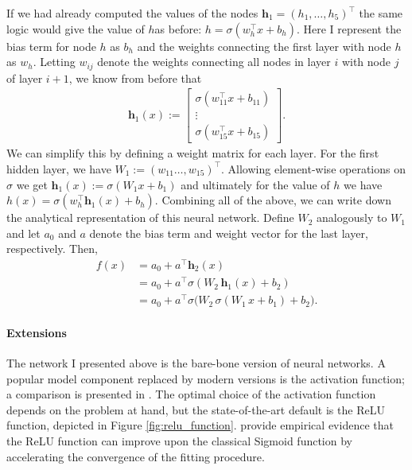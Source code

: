 If we had already computed the values of the nodes $\mathbf{h}_1 = (h_1, \dots,
h_5)^\top$ the same logic would give the value of $h$as before: $h = \sigma(w_h^\top x +
b_h)$. Here I represent the bias term for node $h$ as $b_h$ and the weights connecting
the first layer with node $h$ as $w_h$. Letting $w_{ij}$ denote the weights connecting
all nodes in layer $i$ with node $j$ of layer $i+1$, we know from before that
\begin{align*}
    \mathbf{h}_1(x) :=
        \begin{bmatrix}
            \sigma(w_{11}^\top x + b_{11})\\
            \vdots\\
            \sigma(w_{15}^\top x + b_{15})
        \end{bmatrix}.
\end{align*}
We can simplify this by defining a weight matrix for each layer. For the first hidden
layer, we have $W_1 := (w_{11} \dots, w_{15})^\top$. Allowing element-wise operations on
$\sigma$ we get $\mathbf{h}_1(x) := \sigma(W_1 x + b_1)$ and ultimately for the value of
$h$ we have $h(x) = \sigma(w_h^\top \mathbf{h}_1(x) + b_h)$. Combining all of the above,
we can write down the analytical representation of this neural network. Define $W_2$
analogously to $W_1$ and let $a_0$ and $a$ denote the bias term and weight vector for
the last layer, respectively. Then,
\begin{align*}
    f(x) &= a_0 + a^\top \mathbf{h}_2(x)\\
         &= a_0 + a^\top \sigma(W_2 \, \mathbf{h}_1(x) + b_2)\\
         &= a_0 + a^\top \sigma \big( W_2 \, \sigma(W_1 \, x + b_1) + b_2 \big).
\end{align*}


\paragraph{Extensions}

The network I presented above is the bare-bone version of neural networks. A popular
model component replaced by modern versions is the activation function; a comparison is
presented in \cite{Hara.1994}. The optimal choice of the activation function depends on
the problem at hand, but the state-of-the-art default is the ReLU function, depicted in
Figure \ref{fig:relu_function}. \cite{Hinton.2017} provide empirical evidence that the
ReLU function can improve upon the classical Sigmoid function by accelerating the
convergence of the fitting procedure.


